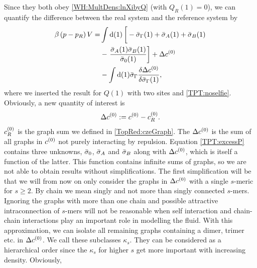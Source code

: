 \documentclass[8.5pt,twoside,twocolumn]{article}
\newcommand\di{\te{d}}
\newcommand\cze{\enmat{c^{(0)}}}
\newcommand\inon{\enmat{\int\di(1)}}
\theoremstyle{standard}
\begin{document}
Since they both obey \eqref{WH:MultDens:lnXibyQ} (with $Q_R(1)=0$), we can quantify the difference
between the real system and the reference system by
\begin{equation}
\begin{aligned}
\be \rb{p-p_R}V =& \inon \lt[\vphantom{\frac 1 2}-\siga(1)+\si_A(1)+\si_B(1)\rt.\\
&-\lt.\frac{\si_A(1)\si_B(1)}{\siz(1)}\rt] + \Dl\cze \\
&- \inon\siga\delti{\Dl\cze}{\siga(1)},
\end{aligned}
\label{TPT:excessP}
\end{equation}
where we inserted the result for $Q(1)$ with two sites and \eqref{TPT:noselfie}. Obviously, a new
quantity of interest is
\newcommand\chs{\enmat{\cze_{R}}}
\newcommand\dc{\enmat{\Dl\cze}}
\newcommand\dcs{\enmat{\dc[s]}}
\begin{equation}
\dc:=\cze-\chs.
\end{equation}
$\chs$ is the graph sum we defined in \eqref{TopRed:czeGraph}. The $\Dl\cze$ is the sum of all
graphs in $\cze$ not purely interacting by repulsion. Equation \eqref{TPT:excessP} contains
three unknowns, $\bar\sigma_0$, $\bar\sigma_A$ and $\bar\sigma_B$ along with $\dc$, which is itself a function
of the latter. This function contains infinite sums of graphs, so we are not able to obtain
results without simplifications. The first simplification will be that
we will from now on only consider the graphs in $\dc$ with a single $s$-meric
 for $s\ge2$. By chain we mean singly
and not more than singly connected $s$-mers. Ignoring the graphs with more than one
chain and possible attractive intraconnection of $s$-mers will not be reasonable
when self interaction and chain-chain interactions play an important role
in modelling the fluid. With this approximation, we can isolate all
remaining graphs containing a dimer, trimer etc. in $\dc$.
We call these subclasses $\kappa_s$. They can be considered as a hierarchical
order since the $\kappa_s$ for higher $s$ get more important with increasing density. Obviously,
\end{document}
